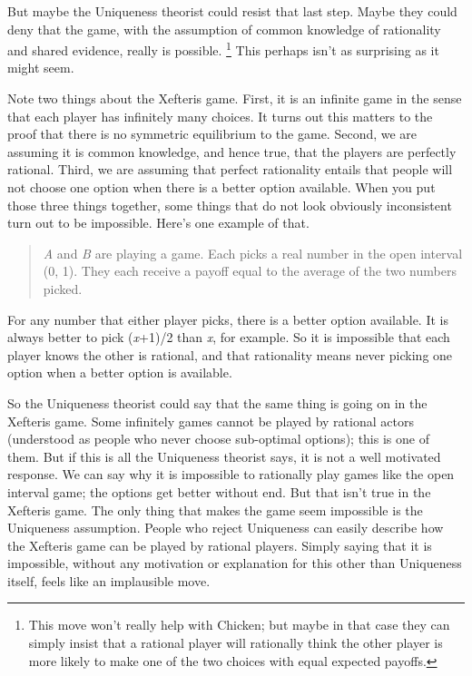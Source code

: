 \documentclass[
  10pt,
  letterpaper,
  DIV=11,
  numbers=noendperiod,
  twoside]{scrartcl}
\begin{document}
But maybe the Uniqueness theorist could resist that last step. Maybe
they could deny that the game, with the assumption of common knowledge
of rationality and shared evidence, really is possible. \footnote{This
  move won't really help with Chicken; but maybe in that case they can
  simply insist that a rational player will rationally think the other
  player is more likely to make one of the two choices with equal
  expected payoffs.} This perhaps isn't as surprising as it might seem.

Note two things about the Xefteris game. First, it is an infinite game
in the sense that each player has infinitely many choices. It turns out
this matters to the proof that there is no symmetric equilibrium to the
game. Second, we are assuming it is common knowledge, and hence true,
that the players are perfectly rational. Third, we are assuming that
perfect rationality entails that people will not choose one option when
there is a better option available. When you put those three things
together, some things that do not look obviously inconsistent turn out
to be impossible. Here's one example of that.

\begin{quote}
\emph{A} and \emph{B} are playing a game. Each picks a real number in
the open interval (0, 1). They each receive a payoff equal to the
average of the two numbers picked.
\end{quote}

For any number that either player picks, there is a better option
available. It is always better to pick (\emph{x}+1)/2 than \emph{x}, for
example. So it is impossible that each player knows the other is
rational, and that rationality means never picking one option when a
better option is available.

So the Uniqueness theorist could say that the same thing is going on in
the Xefteris game. Some infinitely games cannot be played by rational
actors (understood as people who never choose sub-optimal options); this
is one of them. But if this is all the Uniqueness theorist says, it is
not a well motivated response. We can say why it is impossible to
rationally play games like the open interval game; the options get
better without end. But that isn't true in the Xefteris game. The only
thing that makes the game seem impossible is the Uniqueness assumption.
People who reject Uniqueness can easily describe how the Xefteris game
can be played by rational players. Simply saying that it is impossible,
without any motivation or explanation for this other than Uniqueness
itself, feels like an implausible move.
\end{document}
